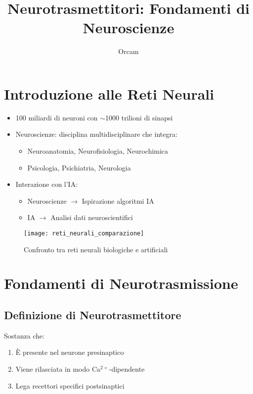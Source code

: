 \documentclass[12pt]{article}
\title{Neurotrasmettitori: Fondamenti di Neuroscienze}
\author{Orcam}
\date{}
\begin{document}
\maketitle

\section{Introduzione alle Reti Neurali}
\begin{itemize}
    \item 100 miliardi di neuroni con $\sim$1000 trilioni di sinapsi
    \item Neuroscienze: disciplina multidisciplinare che integra:
    \begin{itemize}
        \item Neuroanatomia, Neurofisiologia, Neurochimica
        \item Psicologia, Psichiatria, Neurologia
    \end{itemize}
    \item Interazione con l'IA:
    \begin{itemize}
        \item Neuroscienze $\rightarrow$ Ispirazione algoritmi IA
        \item IA $\rightarrow$ Analisi dati neuroscientifici
    \end{itemize}
\end{itemize}

\begin{figure}[h]
    \centering
    \texttt{[image: reti\_neurali\_comparazione]}
    \caption{Confronto tra reti neurali biologiche e artificiali}
\end{figure}

\section{Fondamenti di Neurotrasmissione}
\subsection{Definizione di Neurotrasmettitore}
Sostanza che:
\begin{enumerate}
    \item È presente nel neurone presinaptico
    \item Viene rilasciata in modo Ca$^{2+}$-dipendente
    \item Lega recettori specifici postsinaptici
\end{enumerate}
\end{document}
